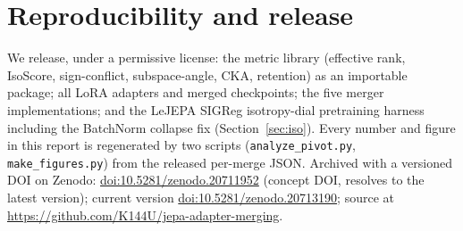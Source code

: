 \documentclass{article}
\begin{document}
\section{Reproducibility and release}
We release, under a permissive license: the metric library (effective rank,
IsoScore, sign-conflict, subspace-angle, CKA, retention) as an importable
package; all LoRA adapters and merged checkpoints; the five merger
implementations; and the LeJEPA SIGReg isotropy-dial pretraining harness
including the BatchNorm collapse fix (Section~\ref{sec:iso}). Every number and
figure in this report is regenerated by two scripts
(\texttt{analyze\_pivot.py}, \texttt{make\_figures.py}) from the released
per-merge JSON. Archived with a versioned DOI on Zenodo:
\href{https://doi.org/10.5281/zenodo.20711952}{doi:10.5281/zenodo.20711952} (concept DOI, resolves to the latest version); current version \href{https://doi.org/10.5281/zenodo.20713190}{doi:10.5281/zenodo.20713190}; source at \url{https://github.com/K144U/jepa-adapter-merging}.



\end{document}
